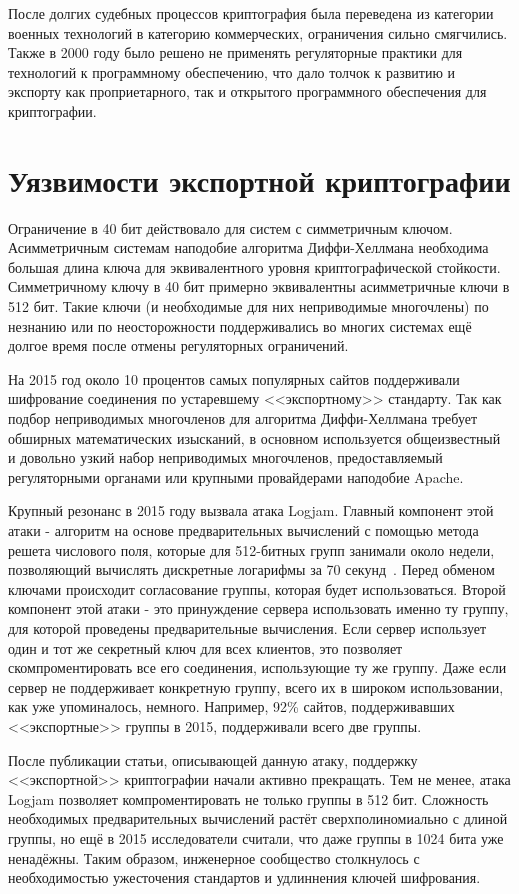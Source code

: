 \documentclass[times,specification,annotation]{itmo-student-thesis}
\begin{document}
После долгих судебных процессов криптография была переведена из категории военных технологий в категорию коммерческих,
ограничения сильно смягчились.
Также в 2000 году было решено не применять регуляторные практики для технологий к программному обеспечению,
что дало толчок к развитию и экспорту как проприетарного, так и открытого программного обеспечения для криптографии.

\section{Уязвимости экспортной криптографии}\label{sec:logjam}

Ограничение в 40 бит действовало для систем с симметричным ключом.
Асимметричным системам наподобие алгоритма Диффи-Хеллмана необходима большая длина ключа для эквивалентного уровня криптографической стойкости.
Симметричному ключу в 40 бит примерно эквивалентны асимметричные ключи в 512 бит.
Такие ключи (и необходимые для них неприводимые многочлены) по незнанию или по неосторожности поддерживались во многих системах ещё
долгое время после отмены регуляторных ограничений.

На 2015 год около 10 процентов самых популярных сайтов поддерживали шифрование соединения по устаревшему <<экспортному>> стандарту.
Так как подбор неприводимых многочленов для алгоритма Диффи-Хеллмана требует обширных математических изысканий,
в основном используется общеизвестный и довольно узкий набор неприводимых многочленов, предоставляемый
регуляторными органами или крупными провайдерами наподобие Apache.

Крупный резонанс в 2015 году вызвала атака Logjam.
Главный компонент этой атаки - алгоритм на основе предварительных вычислений с помощью метода решета числового поля,
которые для 512-битных групп занимали около недели, позволяющий вычислять дискретные логарифмы за 70 секунд~\cite{adr15}.
Перед обменом ключами происходит согласование группы, которая будет использоваться.
Второй компонент этой атаки - это принуждение сервера использовать именно ту группу, для которой проведены предварительные вычисления.
Если сервер использует один и тот же секретный ключ для всех клиентов, это позволяет скомпроментировать все его соединения, использующие ту же группу.
Даже если сервер не поддерживает конкретную группу, всего их в широком использовании, как уже упоминалось, немного.
Например, 92\% сайтов, поддерживавших <<экспортные>> группы в 2015, поддерживали всего две группы.

После публикации статьи, описывающей данную атаку, поддержку <<экспортной>> криптографии начали активно прекращать.
Тем не менее, атака Logjam позволяет компроментировать не только группы в 512 бит.
Сложность необходимых предварительных вычислений растёт сверхполиномиально с длиной группы, но ещё в 2015 исследователи считали,
что даже группы в 1024 бита уже ненадёжны.
Таким образом, инженерное сообщество столкнулось с необходимостью ужесточения стандартов и удлиннения ключей шифрования.
\end{document}
